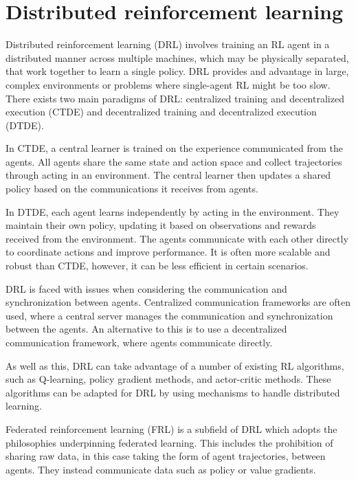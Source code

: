 \section{Distributed reinforcement learning}

Distributed reinforcement learning (DRL) involves training an RL agent in a distributed manner across multiple machines, which may be physically separated, that work together to learn a single policy. DRL provides and advantage in large, complex environments or problems where single-agent RL might be too slow.
There exists two main paradigms of DRL: centralized training and decentralized execution (CTDE) and decentralized training and decentralized execution (DTDE).

In CTDE, a central learner is trained on the experience communicated from the agents. All agents share the same state and action space and collect trajectories through acting in an environment. The central learner then updates a shared policy based on the communications it receives from agents. 

In DTDE, each agent learns independently by acting in the environment. They maintain their own policy, updating it based on observations and rewards received from the environment. The agents communicate with each other directly to coordinate actions and improve performance. It is often more scalable and robust than CTDE, however, it can be less efficient in certain scenarios.

DRL is faced with issues when considering the communication and synchronization between agents. Centralized communication frameworks are often used, where a central server manages the communication and synchronization between the agents. An alternative to this is to use a decentralized communication framework, where agents communicate directly.

As well as this, DRL can take advantage of a number of existing RL algorithms, such as Q-learning, policy gradient methods, and actor-critic methods. These algorithms can be adapted for DRL by using mechanisms to handle distributed learning.

Federated reinforcement learning (FRL) is a subfield of DRL which adopts the philosophies underpinning federated learning. This includes the prohibition of sharing raw data, in this case taking the form of agent trajectories, between agents. They instead communicate data such as policy or value gradients.

